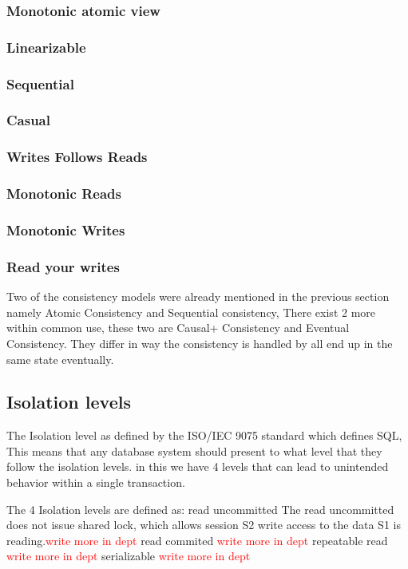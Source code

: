 \documentclass[a4paper,10pt,titlepage]{report}
\begin{document}
\subsubsection{Monotonic atomic view}

\subsubsection{Linearizable}
\subsubsection{Sequential}
\subsubsection{Casual}
\subsubsection{Writes Follows Reads}
\subsubsection{Monotonic Reads}
\subsubsection{Monotonic Writes}
\subsubsection{Read your writes}

Two of the consistency models were already mentioned in the previous section namely Atomic Consistency and Sequential consistency, There exist 2 more within common use, these two are Causal+ Consistency and  Eventual Consistency. They differ in way the consistency is handled by all end up in the same state eventually.

\subsection{Isolation levels}

The Isolation level as defined by the ISO/IEC 9075 standard which defines SQL, This means that any database system should present to what level that they follow the isolation levels. in this we have 4 levels that can lead to unintended behavior within a single transaction.

The 4 Isolation levels are defined as:
read uncommitted
       The read uncommitted does not issue shared lock, which allows session S2 write access to the data S1 is reading.\textcolor{red}{write more in dept}
 read commited
 \textcolor{red}{write more in dept}
repeatable read
\textcolor{red}{write more in dept}
serializable
\textcolor{red}{write more in dept}
\end{document}
